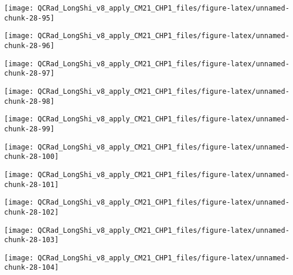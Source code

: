 \documentclass[
  10pt,
  a4paper,oneside]{article}
\begin{document}
\begin{center}\texttt{[image: QCRad\_LongShi\_v8\_apply\_CM21\_CHP1\_files/figure-latex/unnamed-chunk-28-95]} \end{center}

\begin{center}\texttt{[image: QCRad\_LongShi\_v8\_apply\_CM21\_CHP1\_files/figure-latex/unnamed-chunk-28-96]} \end{center}

\begin{center}\texttt{[image: QCRad\_LongShi\_v8\_apply\_CM21\_CHP1\_files/figure-latex/unnamed-chunk-28-97]} \end{center}

\begin{center}\texttt{[image: QCRad\_LongShi\_v8\_apply\_CM21\_CHP1\_files/figure-latex/unnamed-chunk-28-98]} \end{center}

\begin{center}\texttt{[image: QCRad\_LongShi\_v8\_apply\_CM21\_CHP1\_files/figure-latex/unnamed-chunk-28-99]} \end{center}

\begin{center}\texttt{[image: QCRad\_LongShi\_v8\_apply\_CM21\_CHP1\_files/figure-latex/unnamed-chunk-28-100]} \end{center}

\begin{center}\texttt{[image: QCRad\_LongShi\_v8\_apply\_CM21\_CHP1\_files/figure-latex/unnamed-chunk-28-101]} \end{center}

\begin{center}\texttt{[image: QCRad\_LongShi\_v8\_apply\_CM21\_CHP1\_files/figure-latex/unnamed-chunk-28-102]} \end{center}

\begin{center}\texttt{[image: QCRad\_LongShi\_v8\_apply\_CM21\_CHP1\_files/figure-latex/unnamed-chunk-28-103]} \end{center}

\begin{center}\texttt{[image: QCRad\_LongShi\_v8\_apply\_CM21\_CHP1\_files/figure-latex/unnamed-chunk-28-104]} \end{center}
\end{document}
